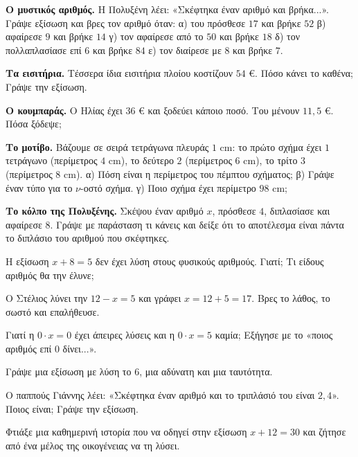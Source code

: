 \ex \textbf{Ο μυστικός αριθμός.} Η Πολυξένη λέει: «Σκέφτηκα έναν αριθμό και βρήκα...». Γράψε εξίσωση και βρες τον αριθμό όταν: α) του πρόσθεσε $17$ και βρήκε $52$ \quad β) αφαίρεσε $9$ και βρήκε $14$ \quad γ) τον αφαίρεσε από το $50$ και βρήκε $18$ \quad δ) τον πολλαπλασίασε επί $6$ και βρήκε $84$ \quad ε) τον διαίρεσε με $8$ και βρήκε $7$.

\ex \textbf{Τα εισιτήρια.} Τέσσερα ίδια εισιτήρια πλοίου κοστίζουν $54$ €. Πόσο κάνει το καθένα; Γράψε την εξίσωση.

\ex \textbf{Ο κουμπαράς.} Ο Ηλίας έχει $36$ € και ξοδεύει κάποιο ποσό. Του μένουν $11{,}5$ €. Πόσα ξόδεψε;

\ex \textbf{Το μοτίβο.} Βάζουμε σε σειρά τετράγωνα πλευράς $1$ cm: το πρώτο σχήμα έχει $1$ τετράγωνο (περίμετρος $4$ cm), το δεύτερο $2$ (περίμετρος $6$ cm), το τρίτο $3$ (περίμετρος $8$ cm). α) Πόση είναι η περίμετρος του πέμπτου σχήματος; β) Γράψε έναν τύπο για το $\nu$-οστό σχήμα. γ) Ποιο σχήμα έχει περίμετρο $98$ cm;


\ex \textbf{Το κόλπο της Πολυξένης.} Σκέψου έναν αριθμό $x$, πρόσθεσε $4$, διπλασίασε και αφαίρεσε $8$. Γράψε με παράσταση τι κάνεις και δείξε ότι το αποτέλεσμα είναι πάντα το διπλάσιο του αριθμού που σκέφτηκες.

\ex Η εξίσωση $x+8=5$ δεν έχει λύση στους φυσικούς αριθμούς. Γιατί; Τι είδους αριθμός θα την έλυνε;

\ex Ο Στέλιος λύνει την $12-x=5$ και γράφει $x=12+5=17$. Βρες το λάθος, το σωστό και επαλήθευσε.

\ex Γιατί η $0\cdot x=0$ έχει άπειρες λύσεις και η $0\cdot x=5$ καμία; Εξήγησε με το «ποιος αριθμός επί $0$ δίνει...».

\ex Γράψε μια εξίσωση με λύση το $6$, μια αδύνατη και μια ταυτότητα.


\ex Ο παππούς Γιάννης λέει: «Σκέφτηκα έναν αριθμό και το τριπλάσιό του είναι $2{,}4$». Ποιος είναι; Γράψε την εξίσωση.

\ex Φτιάξε μια καθημερινή ιστορία που να οδηγεί στην εξίσωση $x+12=30$ και ζήτησε από ένα μέλος της οικογένειας να τη λύσει.
